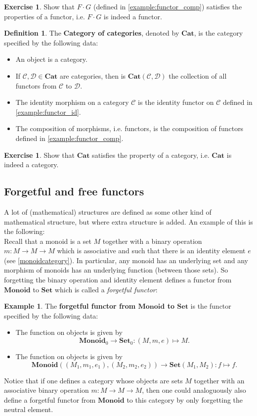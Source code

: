 \documentclass[a4paper,10pt]{scrartcl}
\theoremstyle{plain}
\theoremstyle{definition}
\newtheorem{dfn}[thm]{Definition}
\newtheorem{exa}[thm]{Example}
\newtheorem{exer}[thm]{Exercise}
\newcommand{\Cat}[1]{\mathcal{#1}}
\newcommand{\CC}{\Cat{C}}
\newcommand{\DD}{\Cat{D}}
\newcommand{\Catb}[1]{\mathbf{#1}}
\newcommand{\SET}{\Catb{Set}}
\newcommand{\CAT}{\Catb{Cat}}
\newcommand{\MON}{\Catb{Monoid}}
\newcommand{\Ob}[1]{{#1}_0}
\newcommand{\CHom}[3]{{#1}(#2,#3)}
\newcommand{\Comp}{\cdot}
\begin{document}
\begin{exer} Show that $F\Comp G$ (defined in \cref{example:functor_comp}) satisfies the properties of a functor, i.e. $F\Comp G$ is indeed a functor.
\end{exer}

\begin{dfn} The \textbf{Category of categories}, denoted by $\CAT$, is the category specified by the following data:
\begin{itemize}
\item An object is a category.
\item If $\CC, \DD\in\CAT$ are categories, then is $\CHom \CAT \CC \DD$ the collection of all functors from $\CC$ to $\DD$.
\item The identity morphism on a category $\CC$ is the identity functor on $\CC$ defined in \cref{example:functor_id}.
\item The composition of morphisms, i.e. functors, is the composition of functors defined in \cref{example:functor_comp}.
\end{itemize} 
\end{dfn}

\begin{exer} Show that $\CAT$ satisfies the property of a category, i.e. $\CAT$ is indeed a category.
\end{exer}

\subsection{Forgetful and free functors}
A lot of (mathematical) structures are defined as some other kind of mathematical structure, but where extra structure is added. An example of this is the following:\\
Recall that a monoid is a set $M$ together with a binary operation $m:M\to M\to M$ which is associative and such that there is an identity element $e$ (see \cref{monoidcategory}). In particular, any monoid has an underlying set and any morphism of monoids has an underlying function (between those sets). So forgetting the binary operation and identity element defines a functor from $\MON$ to $\SET$ which is called a \textit{forgetful functor}:
\begin{exa}\label{example:forgetful_montoset} The \textbf{forgetful functor from $\MON$ to $\SET$} is the functor specified by the following data:
\begin{itemize}
\item The function on objects is given by 
\[
\Ob{\MON}\to \Ob{\SET}: (M,m,e)\mapsto M.
\]
\item The function on objects is given by
\[
\CHom{\MON}{(M_1,m_1,e_1)}{(M_2,m_2,e_2)} \to \CHom{\SET}{M_1}{M_2} : f\mapsto f.
\]
\end{itemize}
\end{exa}
Notice that if one defines a category whose objects are sets $M$ together with an associative binary operation $m:M\to M\to M$, then one could analoguously also define a forgetful functor from $\MON$ to this category by only forgetting the neutral element.
\end{document}
